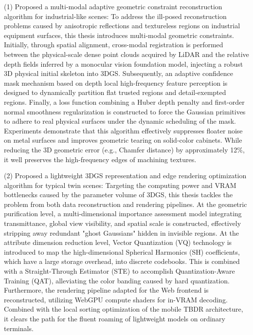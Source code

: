 (1) Proposed a multi-modal adaptive geometric constraint reconstruction algorithm for industrial-like scenes: To address the ill-posed reconstruction problems caused by anisotropic reflections and textureless regions on industrial equipment surfaces, this thesis introduces multi-modal geometric constraints. Initially, through spatial alignment, cross-modal registration is performed between the physical-scale dense point clouds acquired by LiDAR and the relative depth fields inferred by a monocular vision foundation model, injecting a robust 3D physical initial skeleton into 3DGS. Subsequently, an adaptive confidence mask mechanism based on depth local high-frequency feature perception is designed to dynamically partition flat trusted regions and detail-exempted regions. Finally, a loss function combining a Huber depth penalty and first-order normal smoothness regularization is constructed to force the Gaussian primitives to adhere to real physical surfaces under the dynamic scheduling of the mask. Experiments demonstrate that this algorithm effectively suppresses floater noise on metal surfaces and improves geometric tearing on solid-color cabinets. While reducing the 3D geometric error (e.g., Chamfer distance) by approximately 12\%, it well preserves the high-frequency edges of machining textures.

(2) Proposed a lightweight 3DGS representation and edge rendering optimization algorithm for typical twin scenes: Targeting the computing power and VRAM bottlenecks caused by the parameter volume of 3DGS, this thesis tackles the problem from both data reconstruction and rendering pipelines. At the geometric purification level, a multi-dimensional importance assessment model integrating transmittance, global view visibility, and spatial scale is constructed, effectively stripping away redundant "ghost Gaussians" hidden in invisible regions. At the attribute dimension reduction level, Vector Quantization (VQ) technology is introduced to map the high-dimensional Spherical Harmonics (SH) coefficients, which have a large storage overhead, into discrete codebooks. This is combined with a Straight-Through Estimator (STE) to accomplish Quantization-Aware Training (QAT), alleviating the color banding caused by hard quantization. Furthermore, the rendering pipeline adapted for the Web frontend is reconstructed, utilizing WebGPU compute shaders for in-VRAM decoding. Combined with the local sorting optimization of the mobile TBDR architecture, it clears the path for the fluent roaming of lightweight models on ordinary terminals.

